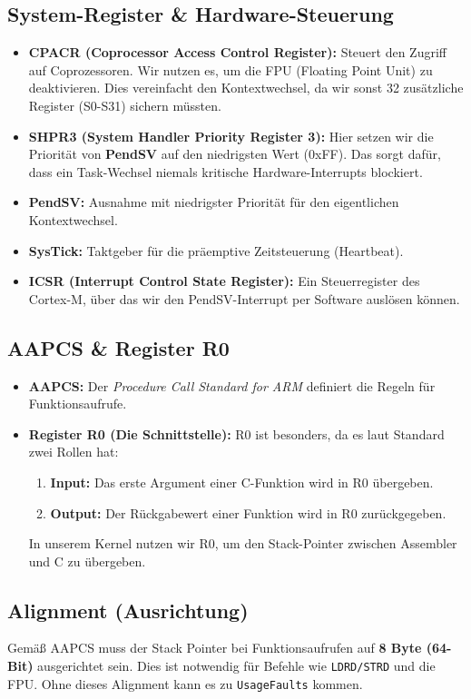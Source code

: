\documentclass[11pt,a4paper]{article}
\begin{document}
\subsection{System-Register \& Hardware-Steuerung}
\begin{itemize}
    \item \textbf{CPACR (Coprocessor Access Control Register):} Steuert den Zugriff auf Coprozessoren. Wir nutzen es, um die FPU (Floating Point Unit) zu deaktivieren. Dies vereinfacht den Kontextwechsel, da wir sonst 32 zusätzliche Register (S0-S31) sichern müssten.
    \item \textbf{SHPR3 (System Handler Priority Register 3):} Hier setzen wir die Priorität von \textbf{PendSV} auf den niedrigsten Wert (0xFF). Das sorgt dafür, dass ein Task-Wechsel niemals kritische Hardware-Interrupts blockiert.
    \item \textbf{PendSV:} Ausnahme mit niedrigster Priorität für den eigentlichen Kontextwechsel.
    \item \textbf{SysTick:} Taktgeber für die präemptive Zeitsteuerung (Heartbeat).
    \item \textbf{ICSR (Interrupt Control State Register):} Ein Steuerregister des Cortex-M, über das wir den PendSV-Interrupt per Software auslösen können.
\end{itemize}

\subsection{AAPCS \& Register R0}
\begin{itemize}
    \item \textbf{AAPCS:} Der \textit{Procedure Call Standard for ARM} definiert die Regeln für Funktionsaufrufe.
    \item \textbf{Register R0 (Die Schnittstelle):} R0 ist besonders, da es laut Standard zwei Rollen hat:
    \begin{enumerate}
        \item \textbf{Input:} Das erste Argument einer C-Funktion wird in R0 übergeben.
        \item \textbf{Output:} Der Rückgabewert einer Funktion wird in R0 zurückgegeben.
    \end{enumerate}
    In unserem Kernel nutzen wir R0, um den Stack-Pointer zwischen Assembler und C zu übergeben.
\end{itemize}

\subsection{Alignment (Ausrichtung)}
Gemäß AAPCS muss der Stack Pointer bei Funktionsaufrufen auf \textbf{8 Byte (64-Bit)} ausgerichtet sein. Dies ist notwendig für Befehle wie \texttt{LDRD/STRD} und die FPU. Ohne dieses Alignment kann es zu \texttt{UsageFaults} kommen.
\end{document}
